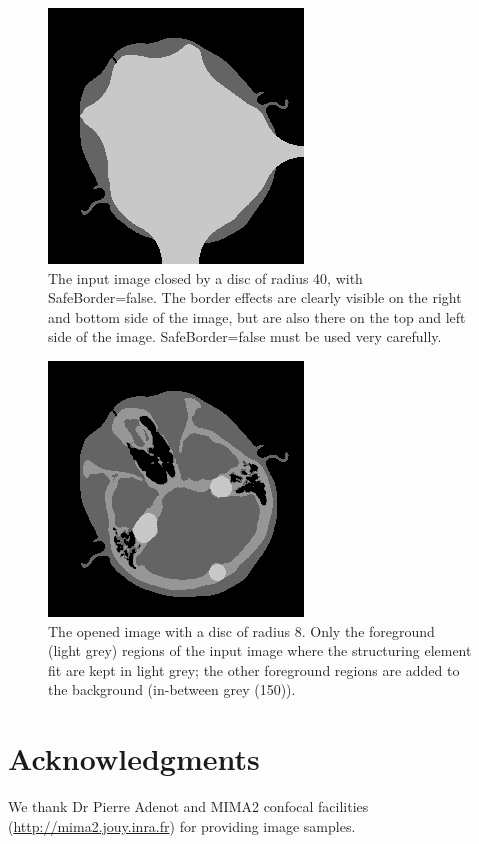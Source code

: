 \documentclass{InsightArticle}
\begin{document}
\begin{figure}[htbp]
\centering
\includegraphics[scale=1]{close-unsafe}
\caption{The input image closed by a disc of radius 40, with SafeBorder=false.
The border effects are clearly visible on the right and bottom side of the
image, but are also there on the top and left side of the image.
SafeBorder=false must be used very carefully.\label{unsafe}}
\end{figure}

\begin{figure}[htbp]
\centering
\includegraphics[scale=1]{open}
\caption{The opened image with a disc of radius 8. Only the foreground (light
grey) regions of the input image where the structuring element fit are kept in
light grey; the other foreground regions are added to the background (in-between
grey (150)).\label{open}}
\end{figure}

\section{Acknowledgments}
We thank Dr Pierre Adenot and MIMA2 confocal facilities (\url{http://mima2.jouy.inra.fr})
for providing image samples.




\nocite{ITKSoftwareGuide}
\end{document}

